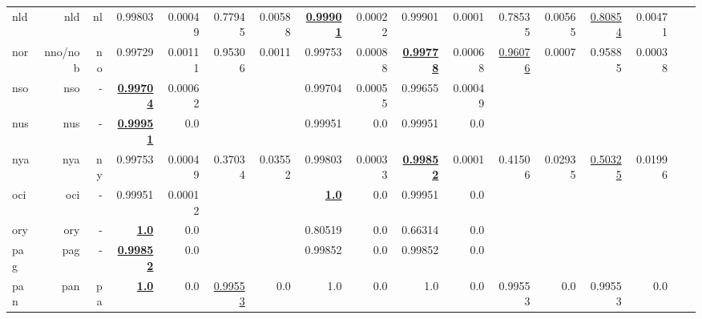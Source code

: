 \documentclass[11pt]{article}
\begin{document}
\begin{table*}[h]
{\begin{tabular}{lrrrrrrrrrrrrrrrr}
nld         & nld         & nl         & 0.99803         & 0.00049         & 0.77945         & 0.00588         & \textbf{\underline{0.99901}}         & 0.00022         & 0.99901         & 0.0001         & 0.78535         & 0.00565         & \underline{0.80854}         & 0.00471         \\
nor         & nno/nob         & no         & 0.99729         & 0.00111         & 0.95306         & 0.0011         & 0.99753         & 0.00088         & \textbf{\underline{0.99778}}         & 0.00068         & \underline{0.96076}         & 0.0007         & 0.95885         & 0.00038         \\
nso         & nso         & -         & \textbf{\underline{0.99704}}         & 0.00062         &          &          & 0.99704         & 0.00055         & 0.99655         & 0.00049         &          &          &          &          \\
nus         & nus         & -         & \textbf{\underline{0.99951}}         & 0.0         &          &          & 0.99951         & 0.0         & 0.99951         & 0.0         &          &          &          &          \\
nya         & nya         & ny         & 0.99753         & 0.00049         & 0.37034         & 0.03552         & 0.99803         & 0.00033         & \textbf{\underline{0.99852}}         & 0.0001         & 0.41506         & 0.02935         & \underline{0.50325}         & 0.01996         \\
oci         & oci         & -         & 0.99951         & 0.00012         &          &          & \textbf{\underline{1.0}}         & 0.0         & 0.99951         & 0.0         &          &          &          &          \\
ory         & ory         & -         & \textbf{\underline{1.0}}         & 0.0         &          &          & 0.80519         & 0.0         & 0.66314         & 0.0         &          &          &          &          \\
pag         & pag         & -         & \textbf{\underline{0.99852}}         & 0.0         &          &          & 0.99852         & 0.0         & 0.99852         & 0.0         &          &          &          &          \\
pan         & pan         & pa         & \textbf{\underline{1.0}}         & 0.0         & \underline{0.99553}         & 0.0         & 1.0         & 0.0         & 1.0         & 0.0         & 0.99553         & 0.0         & 0.99553         & 0.0         \\

\end{tabular}}
\end{table*}
\end{document}
